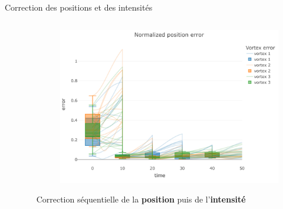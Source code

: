 \documentclass[aspectratio=169]{beamer} %
\begin{document}
\begin{frame}{Correction des positions et des intensités}
    \vspace{-0.5cm}
    \begin{columns}
        \begin{column}{0.5\textwidth}
            \begin{figure}
                \centering
            \end{figure}
        \end{column}
        \begin{column}{0.5\textwidth}
            \begin{figure}
                \centering
                \includegraphics[width=\textwidth]{../../conference/images/align_part_error.pdf}
            \end{figure}

            Correction séquentielle de la \textbf{position} puis de l'\textbf{intensité}
        \end{column}
    \end{columns}
\end{frame}
\end{document}
